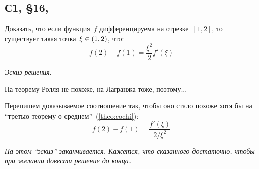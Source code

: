 \documentclass[a4paper,12pt]{article}
\begin{document}
  \subsection{С1, \S 16, }

  Доказать, что если функция~$f$ дифференцируема на отрезке~$[1, 2]$, то существует такая точка~$\xi \hm\in (1, 2)$, что:
  \[
    f(2) - f(1) = \frac{\xi^2}{2} f'(\xi)
  \]
  
  \begin{solution}
    \mbox{}\par\noindent
    \emph{Эскиз решения}.
    
    На теорему Ролля не похоже, на Лагранжа тоже, поэтому...

    Перепишем доказываемое соотношение так, чтобы оно стало похоже хотя бы на ``третью теорему о среднем''~(\ref{theo:cochi}):
    \[
      f(2) - f(1) = \frac{f'(\xi)}{2/\xi^2}
    \]

    \emph{
      На этом ``эскиз'' заканчивается.
      Кажется, что сказанного достаточно, чтобы при желании довести решение до конца.
    }
  \end{solution}
  

\end{document}
